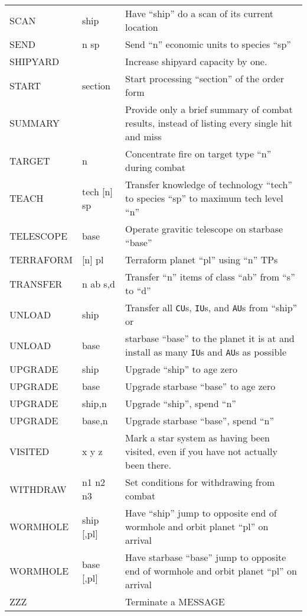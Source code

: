 \documentclass[10pt,titlepage]{article}
\begin{document}
\begin{longtable}{llp{9cm}}
SCAN      &      ship      &      Have ``ship'' do a scan of its current location \\
SEND      &      n sp      &      Send ``n'' economic units to species ``sp'' \\
SHIPYARD  &                &      Increase shipyard capacity by one. \\
START     &      section     &    Start processing ``section'' of the order form \\
SUMMARY   &                  &    Provide only a brief summary of combat results, instead of listing every single hit and miss \\
TARGET   &       n           &    Concentrate fire on target type ``n'' during combat \\
TEACH   &        tech [n] sp &    Transfer knowledge of technology ``tech'' to species ``sp'' to maximum tech level ``n'' \\
TELESCOPE  &     base       &     Operate gravitic telescope on starbase ``base'' \\
TERRAFORM  &     [n] pl     &     Terraform planet ``pl'' using ``n'' TPs \\
TRANSFER   &     n ab s,d   &     Transfer ``n'' items of class ``ab'' from ``s'' to ``d'' \\
UNLOAD    &      ship       &     Transfer all \texttt{CU}s, \texttt{IU}s, and \texttt{AU}s from ``ship'' or \\
UNLOAD    &      base       &     starbase ``base'' to the planet it is at and install as many \texttt{IU}s and \texttt{AU}s as possible \\
UPGRADE   &      ship       &     Upgrade ``ship'' to age zero \\
UPGRADE   &      base       &     Upgrade starbase ``base'' to age zero \\
UPGRADE   &      ship,n     &     Upgrade ``ship'', spend ``n'' \\
UPGRADE   &      base,n     &     Upgrade starbase ``base'', spend ``n'' \\
VISITED   &      x y z      &     Mark a star system as having been visited, even if you have not actually been there. \\
WITHDRAW   &     n1 n2 n3    &    Set conditions for withdrawing from combat \\
WORMHOLE   &     ship [,pl]  &    Have ``ship'' jump to opposite end of wormhole and orbit planet ``pl'' on arrival \\
WORMHOLE   &     base [,pl] &     Have starbase ``base'' jump to opposite end of wormhole and orbit planet ``pl'' on arrival \\
ZZZ       &                  &    Terminate a MESSAGE
\end{longtable}
\end{document}
